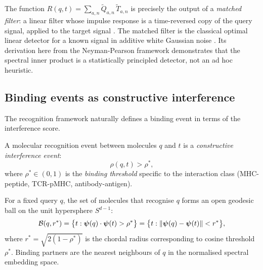 \begin{remark}
The function $R(q,t) = \sum_{a,n}\widetilde{Q}_{a,n}\,\widetilde{T}_{a,n}$
is precisely the output of a \emph{matched filter}: a linear filter whose
impulse response is a time-reversed copy of the query signal, applied to the
target signal \citep{turin1960}. The matched filter is the classical optimal
linear detector for a known signal in additive white Gaussian noise
\citep{wiener1930,kay1998}. Its derivation here from the Neyman-Pearson
framework demonstrates that the spectral inner product is a statistically
principled detector, not an ad hoc heuristic.
\end{remark}

\subsection{Binding events as constructive interference}
\label{im:sec:binding_events}

The recognition framework naturally defines a binding event in terms of the
interference score.

\begin{definition}
\label{im:def:binding}
A molecular recognition event between molecules $q$ and $t$ is a
\emph{constructive interference event}:
\begin{equation}
  \rho(q,t) > \rho^*,
  \label{im:eq:binding_condition}
\end{equation}
where $\rho^* \in (0,1)$ is the \emph{binding threshold} specific to the
interaction class (MHC-peptide, TCR-pMHC, antibody-antigen).
\end{definition}

\begin{corollary}
\label{im:cor:ball}
For a fixed query $q$, the set of molecules that recognise $q$ forms an open
geodesic ball on the unit hypersphere $S^{d-1}$:
\begin{equation}
  \mathcal{B}(q, r^*)
  = \bigl\{t : \bm{\psi}(q)\cdot\bm{\psi}(t) > \rho^*\bigr\}
  = \bigl\{t : \norm{\bm{\psi}(q)-\bm{\psi}(t)} < r^*\bigr\},
  \label{im:eq:binding_ball}
\end{equation}
where $r^* = \sqrt{2(1-\rho^*)}$ is the chordal radius corresponding to
cosine threshold $\rho^*$. Binding partners are the nearest neighbours of $q$
in the normalised spectral embedding space.
\end{corollary}

